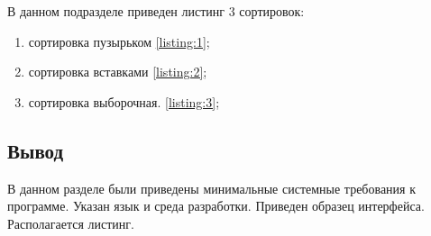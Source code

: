 	В данном подразделе приведен листинг 3 сортировок:
	\begin{enumerate}[1)]
		\item сортировка пузырьком \ref{listing:1};
		\item сортировка вставками \ref{listing:2};
		\item сортировка выборочная. \ref{listing:3};
	\end{enumerate}

	
	
	
	
\subsection{Вывод}
	В данном разделе были приведены минимальные системные требования к программе. 
	Указан язык и среда разработки. Приведен образец интерфейса. Располагается листинг.
